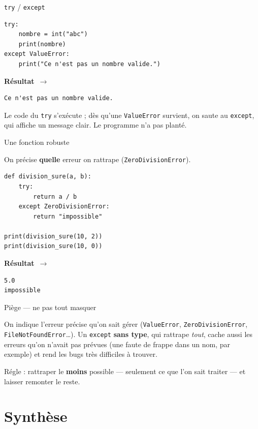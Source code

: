 \documentclass[aspectratio=169,11pt]{beamer}
\newcommand{\resultat}{{\scriptsize\textbf{R\'esultat}~$\rightarrow$}\par\vspace{1pt}}
\begin{document}
\begin{frame}[fragile]{\texttt{try} / \texttt{except}}
\begin{lstlisting}
try:
    nombre = int("abc")
    print(nombre)
except ValueError:
    print("Ce n'est pas un nombre valide.")
\end{lstlisting}
\resultat
\begin{lstlisting}[style=out]
Ce n'est pas un nombre valide.
\end{lstlisting}
{\small Le code du \texttt{try} s'exécute ; dès qu'une \texttt{ValueError} survient, on saute au \texttt{except}, qui affiche un message clair. Le programme n'a pas planté.}
\end{frame}

\begin{frame}[fragile]{Une fonction robuste}
\begin{ucadex}
{\small On précise \textbf{quelle} erreur on rattrape (\texttt{ZeroDivisionError}).}
\end{ucadex}
\begin{lstlisting}
def division_sure(a, b):
    try:
        return a / b
    except ZeroDivisionError:
        return "impossible"

print(division_sure(10, 2))
print(division_sure(10, 0))
\end{lstlisting}
\resultat
\begin{lstlisting}[style=out]
5.0
impossible
\end{lstlisting}
\end{frame}

\begin{frame}{Piège — ne pas tout masquer}
\begin{ucadpiege}
{\small On indique l'erreur précise qu'on sait gérer (\texttt{ValueError}, \texttt{ZeroDivisionError}, \texttt{FileNotFoundError}\ldots). Un \texttt{except} \textbf{sans type}, qui rattrape \emph{tout}, cache aussi les erreurs qu'on n'avait pas prévues (une faute de frappe dans un nom, par exemple) et rend les bugs très difficiles à trouver.}
\end{ucadpiege}
{\small Régle : rattraper le \textbf{moins} possible — seulement ce que l'on sait traiter — et laisser remonter le reste.}
\end{frame}

\section{Synthèse}
\end{document}
